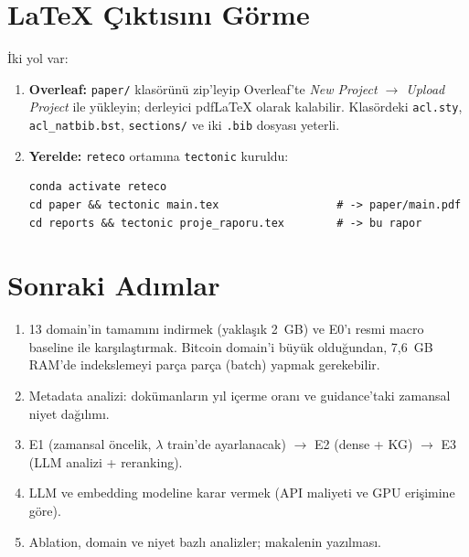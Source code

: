 \documentclass[11pt,a4paper]{article}
\begin{document}
\section{LaTeX Çıktısını Görme}
İki yol var:
\begin{enumerate}
  \item \textbf{Overleaf:} \texttt{paper/} klasörünü zip'leyip Overleaf'te
        \emph{New Project $\rightarrow$ Upload Project} ile yükleyin; derleyici pdfLaTeX olarak
        kalabilir. Klasördeki \texttt{acl.sty}, \texttt{acl\_natbib.bst}, \texttt{sections/}
        ve iki \texttt{.bib} dosyası yeterli.
  \item \textbf{Yerelde:} \texttt{reteco} ortamına \texttt{tectonic} kuruldu:
\begin{Verbatim}[fontsize=\small,frame=single]
conda activate reteco
cd paper && tectonic main.tex                  # -> paper/main.pdf
cd reports && tectonic proje_raporu.tex        # -> bu rapor
\end{Verbatim}
\end{enumerate}

\section{Sonraki Adımlar}
\begin{enumerate}
  \item 13 domain'in tamamını indirmek (yaklaşık 2~GB) ve E0'ı resmi macro baseline ile
        karşılaştırmak. Bitcoin domain'i büyük olduğundan, 7,6~GB RAM'de indekslemeyi parça
        parça (batch) yapmak gerekebilir.
  \item Metadata analizi: dokümanların yıl içerme oranı ve guidance'taki zamansal niyet dağılımı.
  \item E1 (zamansal öncelik, $\lambda$ train'de ayarlanacak) $\rightarrow$ E2 (dense + KG)
        $\rightarrow$ E3 (LLM analizi + reranking).
  \item LLM ve embedding modeline karar vermek (API maliyeti ve GPU erişimine göre).
  \item Ablation, domain ve niyet bazlı analizler; makalenin yazılması.
\end{enumerate}
\end{document}
